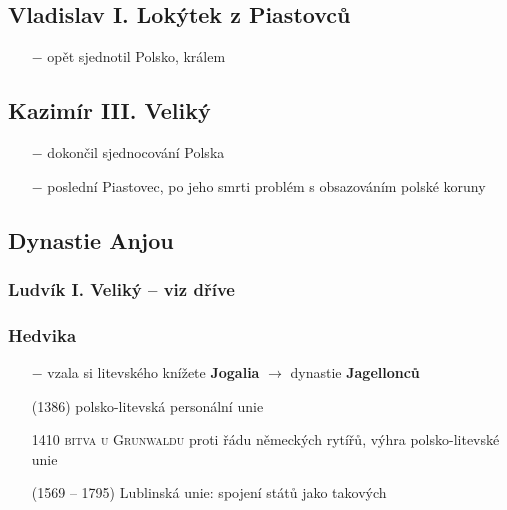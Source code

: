 \documentclass{article}
\begin{document}
\subsection*{Vladislav I. Lokýtek z Piastovců}
\begin{itemize}
    \vspace{-0.5em}
    \setlength\itemsep{0.15em}
    \item[$-$] opět sjednotil Polsko, králem
\end{itemize}

\subsection*{Kazimír III. Veliký}
\begin{itemize}
    \vspace{-0.5em}
    \setlength\itemsep{0.15em}
    \item[$-$] dokončil sjednocování Polska
    \item[$-$] poslední Piastovec, po jeho smrti problém s obsazováním polské koruny
\end{itemize}

\subsection*{Dynastie Anjou}
\subsubsection*{Ludvík I. Veliký -- viz dříve}

\subsubsection*{Hedvika}
\begin{itemize}
    \vspace{-0.5em}
    \setlength\itemsep{0.15em}
    \item[$-$] vzala si litevského knížete \textbf{Jogalia} $\rightarrow$ dynastie \textbf{Jagellonců}
    \item[(1386)] polsko-litevská personální unie
\end{itemize}

\begin{itemize}
    \vspace{-0.5em}
    \setlength\itemsep{0.15em}
    \item[1410] \textsc{bitva u Grunwaldu} proti řádu německých rytířů, výhra polsko-litevské unie
    \item[(1569 -- 1795)] Lublinská unie: spojení států jako takových
\end{itemize}
\end{document}
